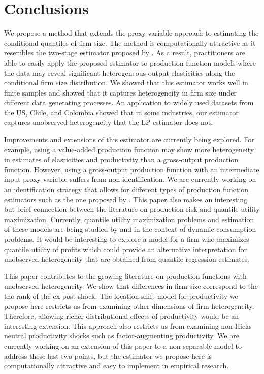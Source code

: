 \documentclass[11pt]{article}
\begin{document}
\section{Conclusions} \label{conclusion}

We propose a method that extends the proxy variable approach to estimating the conditional quantiles of firm size. The method is computationally attractive as it resembles the two-stage estimator proposed by \cite{Canay2011}. As a result, practitioners are able to easily apply the proposed estimator to production function models where the data may reveal significant heterogeneous output elasticities along the conditional firm size distribution. We showed that this estimator works well in finite samples and showed that it captures heterogeneity in firm size under different data generating processes. An application to widely used datasets from the US, Chile, and Colombia showed that in some industries, our estimator captures unobserved heterogeneity that the LP estimator does not.

Improvements and extensions of this estimator are currently being explored. For example, using a value-added production function may show more heterogeneity in estimates of elasticities and productivity than a gross-output production function. However, using a gross-output production function with an intermediate input proxy variable suffers from non-identification. We are currently working on an identification strategy that allows for different types of production function estimators such as the one proposed by \cite{Gandhi2020}. This paper also makes an interesting but brief connection between the literature on production risk and quantile utility maximization. Currently, quantile utility maximization problems and estimation of these models are being studied by \cite{Castro2017} and \cite{qgmm} in the context of dynamic consumption problems. It would be interesting to explore a model for a firm who maximizes quantile utility of profits which could provide an alternative interpretation for unobserved heterogeneity that are obtained from quantile regression estimates.

This paper contributes to the growing literature on production functions with unobserved heterogeneity. We show that differences in firm size correspond to the the rank of the ex-post shock. The location-shift model for productivity we propose here restricts us from examining other dimensions of firm heterogeneity. Therefore, allowing richer distributional effects of productivity would be an interesting extension. This approach also restricts us from examining non-Hicks neutral productivity shocks such as factor-augmenting productivity. We are currently working on an extension of this paper to a non-separable model to address these last two points, but the estimator we propose here is computationally attractive and easy to implement in empirical research.    
\end{document}
